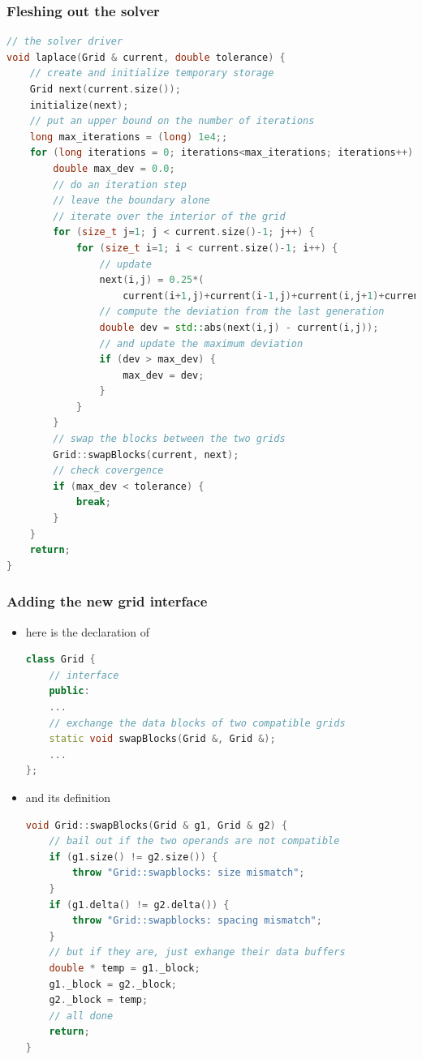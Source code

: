 \begin{frame}[fragile]
%
  \frametitle{Fleshing out the solver}
%
  \begin{lstlisting}[language=c++,basicstyle=\tt\bfseries\tiny,name=seq:solver,firstnumber=169]
// the solver driver
void laplace(Grid & current, double tolerance) {
    // create and initialize temporary storage
    Grid next(current.size());
    initialize(next);
    // put an upper bound on the number of iterations
    long max_iterations = (long) 1e4;;
    for (long iterations = 0; iterations<max_iterations; iterations++) {
        double max_dev = 0.0;
        // do an iteration step
        // leave the boundary alone
        // iterate over the interior of the grid
        for (size_t j=1; j < current.size()-1; j++) {
            for (size_t i=1; i < current.size()-1; i++) {
                // update
                next(i,j) = 0.25*(
                    current(i+1,j)+current(i-1,j)+current(i,j+1)+current(i,j-1));
                // compute the deviation from the last generation
                double dev = std::abs(next(i,j) - current(i,j));
                // and update the maximum deviation
                if (dev > max_dev) {
                    max_dev = dev;
                }
            }
        }
        // swap the blocks between the two grids
        Grid::swapBlocks(current, next);
        // check covergence
        if (max_dev < tolerance) {
            break;
        }
    }
    return;
}
  \end{lstlisting}
%
\end{frame}

\begin{frame}[fragile]
%
  \frametitle{Adding the new grid interface}
%
  \begin{itemize}
  \item here is the declaration of 
%
    \begin{lstlisting}[language=c++,firstnumber=30]
class Grid {
    // interface
    public:
    ...
    // exchange the data blocks of two compatible grids
    static void swapBlocks(Grid &, Grid &);
    ...
};
    \end{lstlisting}
%
  \item and its definition
%
    \begin{lstlisting}[language=c++,firstnumber=69]
void Grid::swapBlocks(Grid & g1, Grid & g2) {
    // bail out if the two operands are not compatible
    if (g1.size() != g2.size()) {
        throw "Grid::swapblocks: size mismatch";
    }
    if (g1.delta() != g2.delta()) {
        throw "Grid::swapblocks: spacing mismatch";
    }
    // but if they are, just exhange their data buffers
    double * temp = g1._block;
    g1._block = g2._block;
    g2._block = temp;
    // all done
    return;
}
    \end{lstlisting}
%
  \end{itemize}
%
\end{frame}

